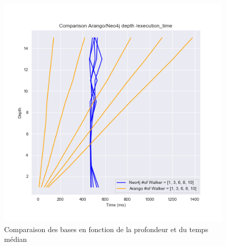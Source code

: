 \documentclass{article} %
\begin{document}
\begin{figure}[!h]
 \centering
 \includegraphics[keepaspectratio = true,scale=0.7]{comparison_depth_time.png}
 \caption{Comparaison des bases en fonction de la profondeur et du temps médian}
 \label{fig:depthtime}
\end{figure}
\end{document}
